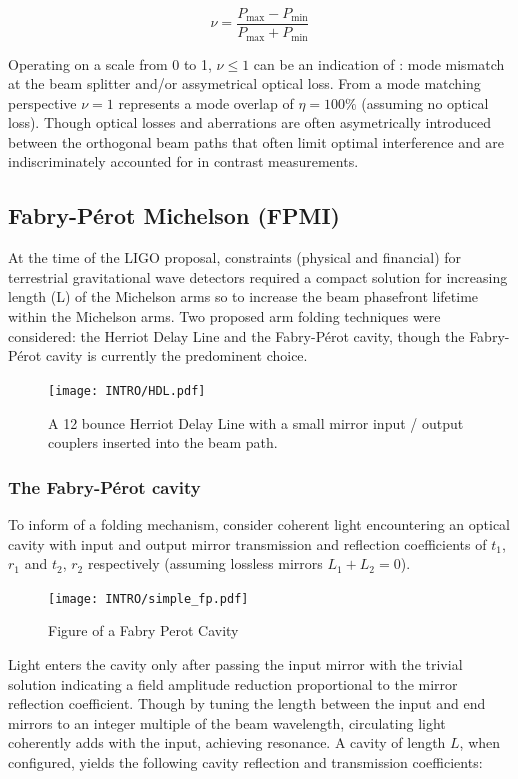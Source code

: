 \begin{equation}\label{eq:contrast}
	\nu = \frac{P_\mathrm{max} - P_\mathrm{min}}{P_\mathrm{max} + P_\mathrm{min}}
\end{equation}

Operating on a scale from 0 to 1, $\nu \le 1$ can be an indication of : mode mismatch at the beam splitter and/or assymetrical optical loss. From a mode matching perspective $\nu = 1$ represents a mode overlap of $\eta = 100 \%$ (assuming no optical loss).  Though optical losses and aberrations are often asymetrically introduced between the orthogonal beam paths that often limit optimal interference and are indiscriminately accounted for in contrast measurements.  

\subsection{Fabry-P\'{e}rot Michelson (FPMI)}
At the time of the LIGO proposal, constraints (physical and financial) for terrestrial gravitational wave detectors required a compact solution for increasing length (L) of the Michelson arms so to increase the beam phasefront lifetime within the Michelson arms. Two proposed arm folding techniques were considered: the Herriot Delay Line and the Fabry-P\'{e}rot cavity, though the Fabry-P\'{e}rot cavity is currently the predominent choice.

\begin{figure}[ht!]
	\centering
	\texttt{[image: INTRO/HDL.pdf]}
	\caption{A 12 bounce Herriot Delay Line with a small mirror input / output couplers inserted into the beam path.}
	\label{fig:hdlcav}
\end{figure}

\subsubsection{The Fabry-P\'{e}rot cavity}
\label{sec:FPC}
To inform of a folding mechanism, consider coherent light encountering an optical cavity with input and output mirror transmission and reflection coefficients of $t_1$, $r_1$ and $t_2$, $r_2$ respectively (assuming lossless mirrors $L_1 + L_2=0$).

\begin{figure}[h!]
	\centering
	\texttt{[image: INTRO/simple\_fp.pdf]}
	\caption{Figure of a Fabry Perot Cavity}
	\label{fig:fpcav}
\end{figure}

Light enters the cavity only after passing the input mirror with the trivial solution indicating a field amplitude reduction proportional to the mirror reflection coefficient. Though by tuning the length between the input and end mirrors to an integer multiple of the beam wavelength, circulating light coherently adds with the input, achieving resonance.  A cavity of length $L$, when configured, yields the following cavity reflection and transmission coefficients: 

